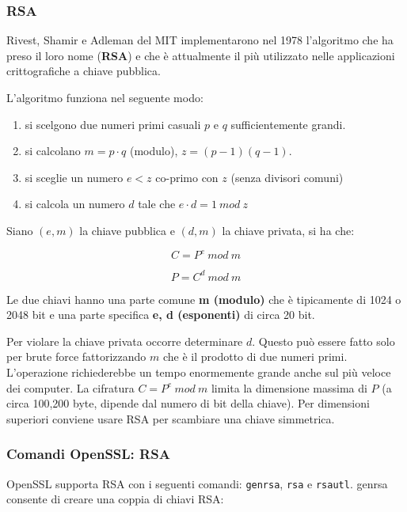         \subsubsection{RSA}
            Rivest, Shamir e Adleman del MIT implementarono nel 1978 l'algoritmo che ha preso il loro nome (\textbf{RSA}) e che è attualmente il più utilizzato nelle applicazioni crittografiche a chiave pubblica.

            L'algoritmo funziona nel seguente modo:
            \begin{enumerate}
                \item si scelgono due numeri primi casuali $p$ e $q$ sufficientemente grandi.
                \item si calcolano $m = p \cdot q$ (modulo), $z = (p - 1)(q - 1)$.
                \item si sceglie un numero $e < z$ co-primo con $z$ (senza divisori comuni)
                \item si calcola un numero $d$ tale che $e \cdot d = 1 ~ mod ~ z$
            \end{enumerate}

            Siano $(e,m)$ la chiave pubblica e $(d,m)$ la chiave privata, si ha che:

            \begin{equation*}
                C = P^e ~ mod ~ m
            \end{equation*}

            \begin{equation*}
                P = C^d ~ mod ~ m
            \end{equation*}

            Le due chiavi hanno una parte comune \textbf{m (modulo)} che è tipicamente di 1024 o 2048 bit e una parte specifica \textbf{e, d (esponenti)} di circa 20 bit.

            Per violare la chiave privata occorre determinare $d$. Questo può essere fatto solo per brute force fattorizzando $m$ che è il prodotto di due numeri primi. L'operazione richiederebbe un tempo enormemente grande anche sul più veloce dei computer. La cifratura $C = P^e ~ mod ~ m$ limita la dimensione massima di $P$ (a circa 100,200 byte, dipende dal numero di bit della chiave). Per dimensioni superiori conviene usare RSA per scambiare una chiave simmetrica.

        \subsubsection{Comandi OpenSSL: RSA}
            OpenSSL supporta RSA con i seguenti comandi: \verb|genrsa|, \verb|rsa| e \verb|rsautl|. genrsa consente di creare una coppia di chiavi RSA:

